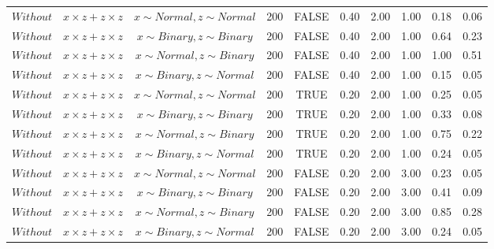 \begin{longtable}{lccccccccc}
  $Without$ & $\textit{x} \times \textit{z} + \textit{z} \times \textit{z}$ & $\textit{x} \sim Normal , \textit{z} \sim Normal$ & 200 & FALSE & 0.40 & 2.00 & 1.00 & 0.18 & 0.06 \\ 
  $Without$ & $\textit{x} \times \textit{z} + \textit{z} \times \textit{z}$ & $\textit{x} \sim Binary, \textit{z} \sim Binary$ & 200 & FALSE & 0.40 & 2.00 & 1.00 & 0.64 & 0.23 \\ 
  $Without$ & $\textit{x} \times \textit{z} + \textit{z} \times \textit{z}$ & $\textit{x} \sim Normal, \textit{z} \sim Binary$ & 200 & FALSE & 0.40 & 2.00 & 1.00 & 1.00 & 0.51 \\ 
  $Without$ & $\textit{x} \times \textit{z} + \textit{z} \times \textit{z}$ & $\textit{x} \sim Binary, \textit{z} \sim Normal$ & 200 & FALSE & 0.40 & 2.00 & 1.00 & 0.15 & 0.05 \\ 
  $Without$ & $\textit{x} \times \textit{z} + \textit{z} \times \textit{z}$ & $\textit{x} \sim Normal , \textit{z} \sim Normal$ & 200 & TRUE & 0.20 & 2.00 & 1.00 & 0.25 & 0.05 \\ 
  $Without$ & $\textit{x} \times \textit{z} + \textit{z} \times \textit{z}$ & $\textit{x} \sim Binary, \textit{z} \sim Binary$ & 200 & TRUE & 0.20 & 2.00 & 1.00 & 0.33 & 0.08 \\ 
  $Without$ & $\textit{x} \times \textit{z} + \textit{z} \times \textit{z}$ & $\textit{x} \sim Normal, \textit{z} \sim Binary$ & 200 & TRUE & 0.20 & 2.00 & 1.00 & 0.75 & 0.22 \\ 
  $Without$ & $\textit{x} \times \textit{z} + \textit{z} \times \textit{z}$ & $\textit{x} \sim Binary, \textit{z} \sim Normal$ & 200 & TRUE & 0.20 & 2.00 & 1.00 & 0.24 & 0.05 \\ 
  $Without$ & $\textit{x} \times \textit{z} + \textit{z} \times \textit{z}$ & $\textit{x} \sim Normal , \textit{z} \sim Normal$ & 200 & FALSE & 0.20 & 2.00 & 3.00 & 0.23 & 0.05 \\ 
  $Without$ & $\textit{x} \times \textit{z} + \textit{z} \times \textit{z}$ & $\textit{x} \sim Binary, \textit{z} \sim Binary$ & 200 & FALSE & 0.20 & 2.00 & 3.00 & 0.41 & 0.09 \\ 
  $Without$ & $\textit{x} \times \textit{z} + \textit{z} \times \textit{z}$ & $\textit{x} \sim Normal, \textit{z} \sim Binary$ & 200 & FALSE & 0.20 & 2.00 & 3.00 & 0.85 & 0.28 \\ 
  $Without$ & $\textit{x} \times \textit{z} + \textit{z} \times \textit{z}$ & $\textit{x} \sim Binary, \textit{z} \sim Normal$ & 200 & FALSE & 0.20 & 2.00 & 3.00 & 0.24 & 0.05 \\ 

\end{longtable}
